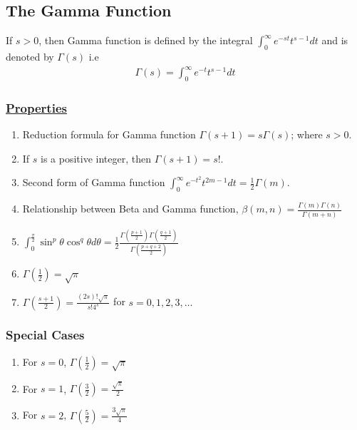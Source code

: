 \documentclass[11pt]{report}
\newcommand{\ubt}[1]{\textbf{\underline{#1}}}
\newcommand{\dsp}{\displaystyle}
\newcommand{\properties}{\subsubsection{\ubt{Properties}}}
\renewcommand{\labelenumi}{\roman{enumi}.}
\begin{document}
	\subsection{The Gamma Function}
	If $s>0$, then Gamma function is defined by the integral $\dsp\int_0^\infty e^{-st}t^{s-1}dt$ and is denoted by $\dsp \Gamma(s)$ i.e
	\begin{eqnarray}
		\Gamma(s) = \int_0^\infty e^{-t}t^{s-1}dt\label{eq:2_1}
	\end{eqnarray}
	
	\properties
	\begin{enumerate}
		\renewcommand{\labelenumi}{\roman{enumi}.}
		\item Reduction formula for Gamma function $\Gamma(s+1)=s\Gamma(s)$; where $s>0$.
		
		\item If $s$ is a positive integer, then $\Gamma(s+1)=s!$.
		
		\item Second form of Gamma function $\dsp\int_0^\infty e^{-t^2}t^{2m-1} dt = \frac{1}{2}\Gamma(m)$.
		
		\item Relationship between Beta and Gamma function, $\dsp\beta(m,n)=\frac{\Gamma(m)\Gamma(n)}{\Gamma(m+n)}$
		
		\item $\dsp\int_0^{\frac{\pi}{2}}\sin^p\theta\cos^q\theta d\theta = \frac{1}{2}\frac{\Gamma\left(\frac{p+1}{2}\right)\Gamma\left(\frac{q+1}{2}\right)}{\Gamma\left(\frac{p+q+2}{2}\right)}$
		
		\item $\dsp\Gamma\left(\frac{1}{2}\right) = \sqrt{\pi}$
		
		\item $\dsp\Gamma\left(\frac{s+1}{2}\right) = \frac{(2s)!\sqrt{\pi}}{s!4^s}$ for $s=0,1,2,3,\ldots$
	\end{enumerate}
	
	\subsubsection{Special Cases}
		\begin{enumerate}
		\renewcommand{\labelenumi}{\roman{enumi}.}
		\item For $s=0$, $\dsp\Gamma\left(\frac{1}{2}\right) = \sqrt{\pi}$
		
		\item For $s=1$, $\dsp \Gamma\left(\frac{3}{2}\right) = \frac{\sqrt{\pi}}{2}$
		
		\item For $s=2$, $\dsp \Gamma\left(\frac{5}{2}\right) = \frac{3\sqrt{\pi}}{4}$
	\end{enumerate}
	
\end{document}
